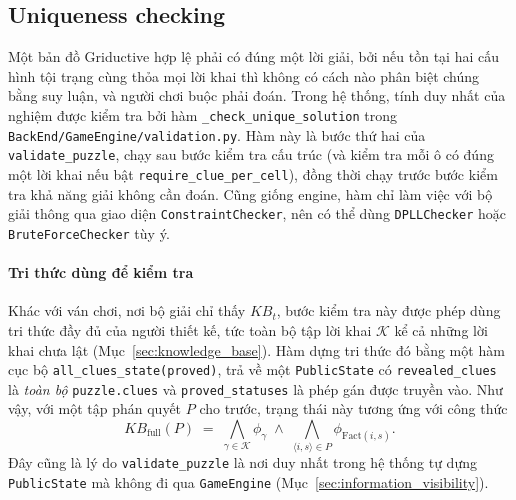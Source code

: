 \subsection{Uniqueness checking}
\label{sec:uniqueness_checking}
\begin{sloppypar}
\titleformat{\paragraph}[hang]{\normalfont\bfseries}{}{0pt}{}
\titlespacing*{\paragraph}{0pt}{8pt}{2pt}

Một bản đồ Griductive hợp lệ phải có đúng một lời giải, bởi nếu tồn tại hai cấu
hình tội trạng cùng thỏa mọi lời khai thì không có cách nào phân biệt chúng bằng
suy luận, và người chơi buộc phải đoán. Trong hệ thống, tính duy nhất của nghiệm
được kiểm tra bởi hàm \texttt{\_check\_unique\_solution} trong
\texttt{BackEnd/GameEngine/validation.py}. Hàm này là bước thứ hai của
\texttt{validate\_puzzle}, chạy sau bước kiểm tra cấu trúc (và kiểm tra mỗi ô có
đúng một lời khai nếu bật \texttt{require\_clue\_per\_cell}), đồng thời chạy
trước bước kiểm tra khả năng giải không cần đoán. Cũng giống engine, hàm chỉ
làm việc với bộ giải thông qua giao diện \texttt{ConstraintChecker}, nên có thể
dùng \texttt{DPLLChecker} hoặc \texttt{BruteForceChecker} tùy ý.

\paragraph{Tri thức dùng để kiểm tra}
Khác với ván chơi, nơi bộ giải chỉ thấy $\mathit{KB}_t$, bước kiểm tra này được
phép dùng tri thức đầy đủ của người thiết kế, tức toàn bộ tập lời khai
$\mathcal{K}$ kể cả những lời khai chưa lật (Mục~\ref{sec:knowledge_base}). Hàm
dựng tri thức đó bằng một hàm cục bộ \texttt{all\_clues\_state(proved)}, trả về
một \texttt{PublicState} có \texttt{revealed\_clues} là \emph{toàn bộ}
\texttt{puzzle.clues} và \texttt{proved\_statuses} là phép gán được truyền vào.
Như vậy, với một tập phán quyết $P$ cho trước, trạng thái này tương ứng với công
thức
\begin{equation}
  \mathit{KB}_{\mathrm{full}}(P) \;=\;
  \bigwedge_{\gamma \in \mathcal{K}} \phi_\gamma \;\land\;
  \bigwedge_{\langle i, s\rangle \in P} \phi_{\mathrm{Fact}(i,s)} .
  \label{eq:kb_full}
\end{equation}
Đây cũng là lý do \texttt{validate\_puzzle} là nơi duy nhất trong hệ thống tự
dựng \texttt{PublicState} mà không đi qua \texttt{GameEngine}
(Mục~\ref{sec:information_visibility}).


\end{sloppypar}
